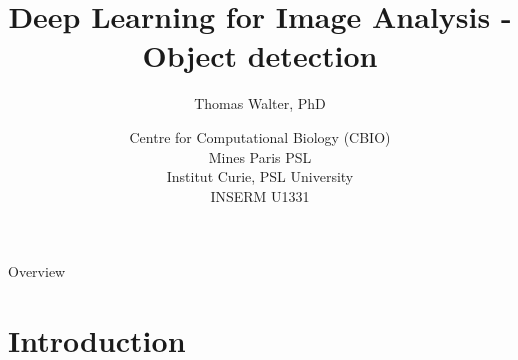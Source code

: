 \documentclass[xcolor=pdftex,dvipsnames,table]{beamer}
\title{Deep Learning for Image Analysis - \\
	   Object detection}
\author{Thomas Walter, PhD}
\date{Centre for Computational Biology (CBIO) \\
	  Mines Paris PSL \\
	  Institut Curie, PSL University \\
	  INSERM U1331}
\begin{document}
\begin{frame}
\titlepage
\end{frame}

\begin{frame}{Overview}
\tableofcontents
\end{frame}

\section{Introduction}

\end{document}
